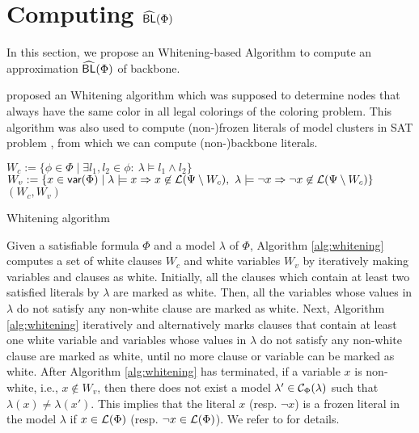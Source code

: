 \section{Computing ${\sf \widehat{BL}}(\Phi)$}
In this section, we propose an Whitening-based Algorithm to compute an approximation ${\sf \widehat{BL}}(\Phi)$ of backbone.

\cite{Par03} proposed an Whitening algorithm which was supposed to determine nodes that always have the same color in all legal colorings of the coloring problem.
This algorithm was also used to compute (non-)frozen literals of model clusters in SAT problem \cite{LMZ09}, from which we can compute (non-)backbone literals.


\begin{algorithm}
\SetAlgoShortEnd
\SetFillComment
{}
$W_c:= \{\phi\in\Phi \mid \exists l_1,l_2\in\phi: \  \lambda\models l_1\wedge l_2\}$\;   
$W_v:=\{x\in \textsf{var}(\Phi)\mid \lambda\models x\Rightarrow x\not\in {\cal L}(\Psi\setminus W_c),
        \ \lambda\models \neg x\Rightarrow \neg x\not\in {\cal L}(\Psi\setminus W_c)\}$\;
\Return $(W_c, W_v)$\;
\caption{Whitening algorithm}
\label{alg:whitening}
\end{algorithm}

Given a satisfiable formula $\Phi$ and a model $\lambda$ of $\Phi$, 
Algorithm \ref{alg:whitening} computes a set of white clauses $W_c$ and white variables $W_v$ by iteratively making variables and clauses as white.
Initially, all the clauses which contain at least two satisfied literals by $\lambda$ are marked as white.
Then, all the variables whose values in $\lambda$ do not satisfy any non-white clause are marked as white.
Next, Algorithm \ref{alg:whitening} iteratively and alternatively marks clauses that contain at least one white variable and variables whose values in $\lambda$ do not satisfy any non-white clause are marked as white, until no more clause or variable can be marked as white.
After Algorithm \ref{alg:whitening} has terminated, if a variable $x$ is non-white, i.e., $x\not\in W_v$, then there does not exist 
a model $\lambda'\in \mathcal{C}_\Phi(\lambda)$ such that $\lambda(x)\neq \lambda(x')$. This implies that the literal $x$ (resp. $\neg x$) is a frozen literal
in the model $\lambda$ if $x\in {\cal L}(\Phi)$ (resp. $\neg x\in {\cal L}(\Phi)$). We refer to \cite{LMZ09} for details.


